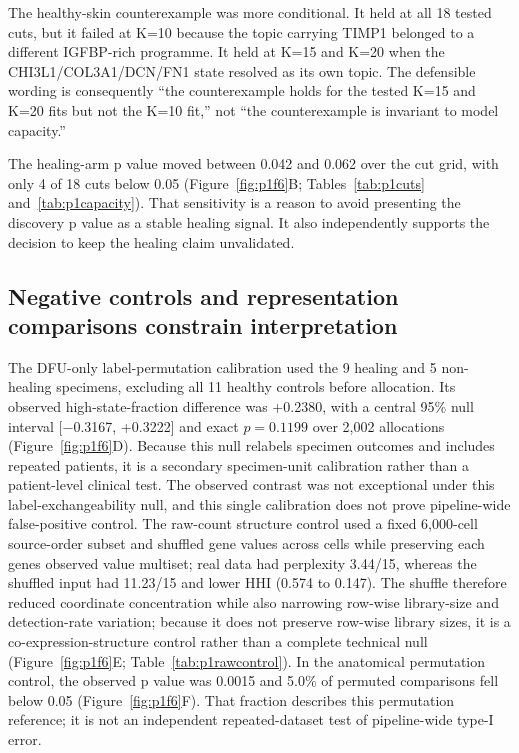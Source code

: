 The healthy-skin counterexample was more conditional. It held at all 18 tested cuts, but it failed at K=10 because the topic carrying TIMP1 belonged to a different IGFBP-rich programme. It held at K=15 and K=20 when the CHI3L1/COL3A1/DCN/FN1 state resolved as its own topic. The defensible wording is consequently ``the counterexample holds for the tested K=15 and K=20 fits but not the K=10 fit,'' not ``the counterexample is invariant to model capacity.''

The healing-arm p value moved between 0.042 and 0.062 over the cut grid, with only 4 of 18 cuts below 0.05 (Figure~\ref{fig:p1f6}B; Tables~\ref{tab:p1cuts} and~\ref{tab:p1capacity}). That sensitivity is a reason to avoid presenting the discovery p value as a stable healing signal. It also independently supports the decision to keep the healing claim unvalidated.

\subsection{Negative controls and representation comparisons constrain interpretation}

The DFU-only label-permutation calibration used the 9 healing and 5 non-healing specimens, excluding all 11 healthy controls before allocation. Its observed high-state-fraction difference was +0.2380, with a central 95\% null interval {[}−0.3167, +0.3222{]} and exact $p=0.1199$ over 2,002 allocations (Figure~\ref{fig:p1f6}D). Because this null relabels specimen outcomes and includes repeated patients, it is a secondary specimen-unit calibration rather than a patient-level clinical test. The observed contrast was not exceptional under this label-exchangeability null, and this single calibration does not prove pipeline-wide false-positive control. The raw-count structure control used a fixed 6,000-cell source-order subset and shuffled gene values across cells while preserving each gene\textquotesingle{}s observed value multiset; real data had perplexity 3.44/15, whereas the shuffled input had 11.23/15 and lower HHI (0.574 to 0.147). The shuffle therefore reduced coordinate concentration while also narrowing row-wise library-size and detection-rate variation; because it does not preserve row-wise library sizes, it is a co-expression-structure control rather than a complete technical null (Figure~\ref{fig:p1f6}E; Table~\ref{tab:p1rawcontrol}). In the anatomical permutation control, the observed p value was 0.0015 and 5.0\% of permuted comparisons fell below 0.05 (Figure~\ref{fig:p1f6}F). That fraction describes this permutation reference; it is not an independent repeated-dataset test of pipeline-wide type-I error.


